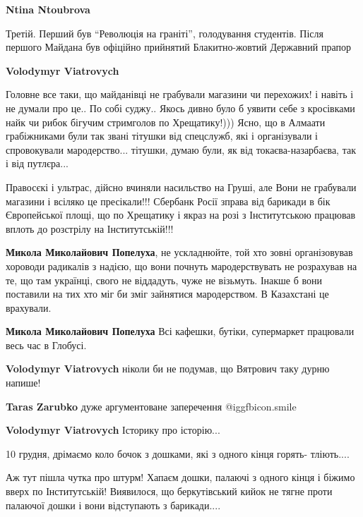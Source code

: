 \begin{itemize}
\begin{itemize}
\begin{itemize} %
\textbf{Ntina Ntoubrova} 

Третій. Перший був \enquote{Революція на граніті}, голодування студентів. Після
першого Майдана був офіційно прийнятий Блакитно-жовтий Державний прапор

\end{itemize} %

\textbf{Volodymyr Viatrovych} 

Головне все таки, що майданівці не грабували магазини чи перехожих! і навіть і
не думали про це.. По собі суджу.. Якось дивно було б уявити себе з кросівками
найк чи рибок бігучим стримголов по Хрещатику!))) Ясно, що в Алмаати
грабіжниками були так звані тітушки від спецслужб, які і організували і
спровокували мародерство... тітушки, думаю були, як від токаєва-назарбаєва, так
і від путлєра...

Правосєкі і ультрас, дійсно вчиняли насильство на Груші, але Вони не грабували
магазини і всіляко це пресікали!!! Сбербанк Росії зправа від барикади в бік
Європейської площі, що по Хрещатику і якраз на розі з Інститутською працював
вплоть до розстрілу на Інститутській!!!

\begin{itemize} %
\textbf{Микола Миколайович Попелуха}, не ускладнюйте, той хто зовні організовував хороводи радикалів з надією, що вони почнуть мародерствувать не розрахував на те, що там українці, свого не віддадуть, чуже не візьмуть. Інакше б вони поставили на тих хто міг би зміг зайнятися мародерством. В Казахстані це врахували.

\textbf{Микола Миколайович Попелуха} Всі кафешки, бутіки, супермаркет працювали весь час в Глобусі.
\end{itemize} %

\textbf{Volodymyr Viatrovych} ніколи би не подумав, що Вятрович таку дурню напише!

\begin{itemize} %
\textbf{Taras Zarubko} дуже аргументоване заперечення  @igg{fbicon.smile} 

\textbf{Volodymyr Viatrovych} Історику про історію...

10 грудня, дрімаємо коло бочок з дошками, які з одного кінця горять- тліють....

Аж тут пішла чутка про штурм! Хапаєм дошки, палаючі з одного кінця і біжимо
вверх по Інститутській! Виявилося, що беркутівський кийок не тягне проти
палаючої дошки і вони відступають з барикади....


\end{itemize}
\end{itemize}
\end{itemize}
